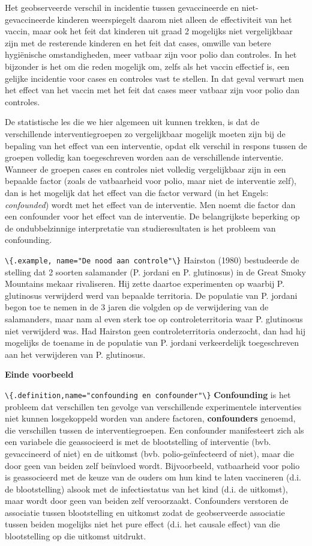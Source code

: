 \documentclass[
  12pt,dutch,coursenotes]{book}
\newcommand{\passthrough}[1]{#1}
\begin{document}
Het geobserveerde verschil in incidentie tussen gevaccineerde en
niet-gevaccineerde kinderen weerspiegelt daarom niet alleen de effectiviteit
van het vaccin, maar ook het feit dat kinderen uit graad 2 mogelijks niet
vergelijkbaar zijn met de resterende kinderen en het feit dat cases, omwille
van betere hygiënische omstandigheden, meer vatbaar zijn voor polio dan
controles. In het bijzonder is het om die reden mogelijk om, zelfs als het
vaccin effectief is, een gelijke incidentie voor cases en controles vast te
stellen. In dat geval verwart men het effect van het vaccin met het feit dat
cases meer vatbaar zijn voor polio dan controles.

De statistische les die we hier algemeen uit kunnen trekken, is dat de
verschillende interventiegroepen zo vergelijkbaar mogelijk moeten zijn bij
de bepaling van het effect van een interventie, opdat elk verschil in respons tussen
de groepen volledig kan toegeschreven worden aan de verschillende
interventie. Wanneer de groepen cases en controles niet volledig
vergelijkbaar zijn in een bepaalde factor (zoals de vatbaarheid voor polio,
maar niet de interventie zelf), dan is het mogelijk dat het effect van die
factor verward (in het Engels: \emph{confounded}) wordt met het effect van
de interventie. Men noemt die factor dan een confounder voor het effect van
de interventie. De belangrijkste beperking op de ondubbelzinnige interpretatie van studieresultaten is het probleem van confounding.

\passthrough{\lstinline!\{.example, name="De nood aan controle"\}!}
Hairston (1980) bestudeerde de stelling dat 2 soorten salamander (P. jordani en P. glutinosus) in de Great Smoky Mountains mekaar rivaliseren. Hij zette daartoe experimenten op waarbij P. glutinosus verwijderd werd van bepaalde territoria. De populatie van P. jordani begon toe te nemen in de 3 jaren die volgden op de verwijdering van de salamanders, maar nam al even sterk toe op controleterritoria waar P. glutinosus niet verwijderd was. Had Hairston geen controleterritoria onderzocht, dan had hij mogelijks de toename in de populatie van P. jordani verkeerdelijk toegeschreven aan het verwijderen van P. glutinosus.

\textbf{Einde voorbeeld}

\passthrough{\lstinline!\{.definition,name="confounding en confounder"\}!}
\textbf{Confounding} is het probleem dat verschillen ten gevolge van verschillende experimentele interventies niet kunnen losgekoppeld worden van andere factoren, \textbf{confounders} genoemd, die verschillen tussen de interventiegroepen. Een confounder manifesteert zich als een variabele die geassocieerd
is met de blootstelling of interventie (bvb. gevaccineerd of niet) en de uitkomst (bvb.
polio-geïnfecteerd of niet), maar die door geen van beiden zelf beïnvloed wordt. Bijvoorbeeld, vatbaarheid voor polio is geassocieerd met de
keuze van de ouders om hun kind te laten vaccineren (d.i. de blootstelling)
alsook met de infectiestatus van het kind (d.i. de uitkomst), maar wordt
door geen van beiden zelf veroorzaakt. Confounders verstoren de associatie
tussen blootstelling en uitkomst zodat de geobserveerde associatie tussen
beiden mogelijks niet het pure effect (d.i. het causale effect) van die
blootstelling op die uitkomst uitdrukt.
\end{document}
